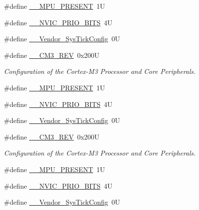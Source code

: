 \begin{DoxyCompactItemize}
\#define \hyperlink{group___configuration__section__for___c_m_s_i_s_ga4127d1b31aaf336fab3d7329d117f448}{\-\_\-\-\_\-\-M\-P\-U\-\_\-\-P\-R\-E\-S\-E\-N\-T}~1\-U
\item 
\#define \hyperlink{group___configuration__section__for___c_m_s_i_s_gae3fe3587d5100c787e02102ce3944460}{\-\_\-\-\_\-\-N\-V\-I\-C\-\_\-\-P\-R\-I\-O\-\_\-\-B\-I\-T\-S}~4\-U
\item 
\#define \hyperlink{group___configuration__section__for___c_m_s_i_s_gab58771b4ec03f9bdddc84770f7c95c68}{\-\_\-\-\_\-\-Vendor\-\_\-\-Sys\-Tick\-Config}~0\-U
\item 
\#define \hyperlink{group___configuration__section__for___c_m_s_i_s_gac6a3f185c4640e06443c18b3c8d93f53}{\-\_\-\-\_\-\-C\-M3\-\_\-\-R\-E\-V}~0x200\-U
\begin{DoxyCompactList}\small\item\em Configuration of the Cortex-\/\-M3 Processor and Core Peripherals. \end{DoxyCompactList}\item 
\#define \hyperlink{group___configuration__section__for___c_m_s_i_s_ga4127d1b31aaf336fab3d7329d117f448}{\-\_\-\-\_\-\-M\-P\-U\-\_\-\-P\-R\-E\-S\-E\-N\-T}~1\-U
\item 
\#define \hyperlink{group___configuration__section__for___c_m_s_i_s_gae3fe3587d5100c787e02102ce3944460}{\-\_\-\-\_\-\-N\-V\-I\-C\-\_\-\-P\-R\-I\-O\-\_\-\-B\-I\-T\-S}~4\-U
\item 
\#define \hyperlink{group___configuration__section__for___c_m_s_i_s_gab58771b4ec03f9bdddc84770f7c95c68}{\-\_\-\-\_\-\-Vendor\-\_\-\-Sys\-Tick\-Config}~0\-U
\item 
\#define \hyperlink{group___configuration__section__for___c_m_s_i_s_gac6a3f185c4640e06443c18b3c8d93f53}{\-\_\-\-\_\-\-C\-M3\-\_\-\-R\-E\-V}~0x200\-U
\begin{DoxyCompactList}\small\item\em Configuration of the Cortex-\/\-M3 Processor and Core Peripherals. \end{DoxyCompactList}\item 
\#define \hyperlink{group___configuration__section__for___c_m_s_i_s_ga4127d1b31aaf336fab3d7329d117f448}{\-\_\-\-\_\-\-M\-P\-U\-\_\-\-P\-R\-E\-S\-E\-N\-T}~1\-U
\item 
\#define \hyperlink{group___configuration__section__for___c_m_s_i_s_gae3fe3587d5100c787e02102ce3944460}{\-\_\-\-\_\-\-N\-V\-I\-C\-\_\-\-P\-R\-I\-O\-\_\-\-B\-I\-T\-S}~4\-U
\item 
\#define \hyperlink{group___configuration__section__for___c_m_s_i_s_gab58771b4ec03f9bdddc84770f7c95c68}{\-\_\-\-\_\-\-Vendor\-\_\-\-Sys\-Tick\-Config}~0\-U

\end{DoxyCompactItemize}
